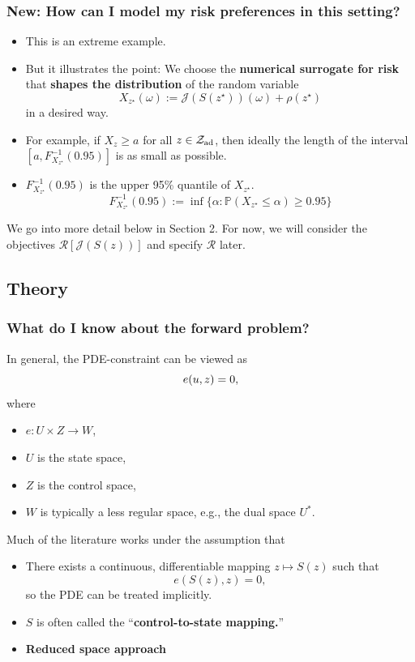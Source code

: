 \documentclass[aspectratio=169,xcolor=dvipsnames,10pt]{beamer}
\newcommand{\Zad}{\mathcal{Z}_{\text{\textup{ad}}}}
\newcommand{\risk}{\mathcal{R}}
\begin{document}
\begin{frame}\frametitle{New: How can I model my risk preferences in this setting?}
\begin{block}{}
\begin{itemize}
\item This is an extreme example. 
\item But it illustrates the point: We choose the \textbf{numerical surrogate for risk} that \textbf{shapes the distribution} of the random variable
\[
X_{z^{\star}}(\omega) := \mathcal{J}(S(z^{\star}))(\omega) + \rho(z^{\star})
\] 
in a desired way.
\item For example, if $X_{z} \ge a$ for all $z \in \Zad$, then ideally the length of the interval $[a,F_{X_{z^{\star}}}^{-1}(0.95)]$ is as small as possible.
\item $F_{X_{z^{\star}}}^{-1}(0.95)$ is the upper 95\% quantile of $X_{z^{\star}}$.
\[
F_{X_{z^{\star}}}^{-1}(0.95) := \inf \{ \alpha : \mathbb P(X_{z^{\star}} \le \alpha ) \ge 0.95 \}
\]
\end{itemize}
\end{block}
\begin{block}{}
\centering
We go into more detail below in Section 2. 
For now, we will consider the objectives $\risk[\mathcal{J}(S(z))]$ and specify $\risk$ later.
\end{block}
\end{frame}

\subsection{Theory}
\begin{frame}\frametitle{What do I know about the forward problem?}
\begin{block}{}
In general, the PDE-constraint can be viewed as 
\[
\vspace{-1ex}
e(u,z) = 0,
\vspace{-1ex}
\]
where
\begin{itemize}
\item  $e : U \times Z \to W$,
\item  $U$ is the state space,
\item  $Z$ is the control space,
\item $W$ is typically a less regular space, e.g., the dual space $U^*$.
\end{itemize}
\end{block}
\vspace{-2ex}
\begin{block}{}
Much of the literature works under the assumption that 
\begin{itemize}
\item  There exists a continuous, differentiable mapping $z \mapsto S(z)$ such that 
\[
e(S(z),z) = 0,
\]
so the PDE can be treated implicitly.  
\item $S$ is often called the ``\textbf{control-to-state mapping.}'' 
\item \textbf{Reduced space approach}
\end{itemize}
\end{block}
\end{frame}
\end{document}
